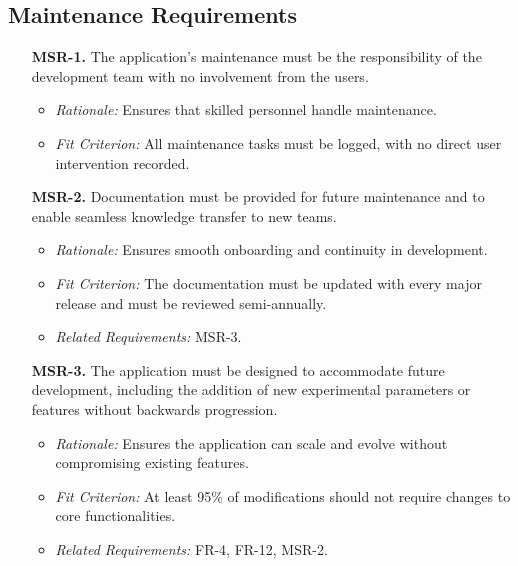 \documentclass[12pt]{article}
\begin{document}
\subsection{Maintenance Requirements}
\begin{enumerate}
  \item[\textbf{MSR-1.}] The application’s maintenance must be the
  responsibility of the development team with no involvement from the users.
  \begin{itemize}
    \item \textit{Rationale:} Ensures that skilled personnel handle maintenance.
    \item \textit{Fit Criterion:} All maintenance tasks must be logged, with no 
    direct user intervention recorded.
  \end{itemize}

  \item[\textbf{MSR-2.}] Documentation must be provided for future maintenance 
  and to enable seamless knowledge transfer to new teams.
  \begin{itemize}
    \item \textit{Rationale:} Ensures smooth onboarding and continuity in 
    development.
    \item \textit{Fit Criterion:} The documentation must be updated with every 
    major release and must be reviewed semi-annually.
    \item \textit{Related Requirements:} MSR-3.
  \end{itemize}

  \item[\textbf{MSR-3.}] The application must be designed to accommodate future 
  development, including the addition of new experimental parameters or features 
  without backwards progression.
  \begin{itemize}
    \item \textit{Rationale:} Ensures the application can scale and evolve 
    without compromising existing features.
    \item \textit{Fit Criterion:} At least 95\% of modifications should not 
    require changes to core functionalities.
    \item \textit{Related Requirements:} FR-4, FR-12, MSR-2.
  \end{itemize}
\end{enumerate}
\end{document}
